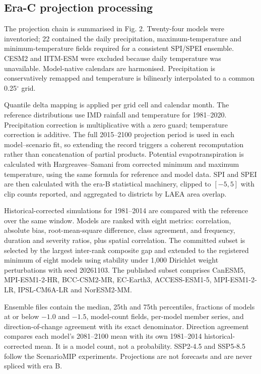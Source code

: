 \documentclass[11pt,a4paper]{article}
\begin{document}
\subsection*{Era-C projection processing}
The projection chain is summarised in Fig. 2. Twenty-four models were inventoried; 22 contained the daily precipitation, maximum-temperature and minimum-temperature fields required for a consistent SPI/SPEI ensemble. CESM2 and IITM-ESM were excluded because daily temperature was unavailable. Model-native calendars are harmonised. Precipitation is conservatively remapped and temperature is bilinearly interpolated to a common 0.25$^\circ$ grid.

Quantile delta mapping is applied per grid cell and calendar month\citep{Cannon2015}. The reference distributions use IMD rainfall and temperature for 1981--2020. Precipitation correction is multiplicative with a zero guard; temperature correction is additive. The full 2015--2100 projection period is used in each model--scenario fit, so extending the record triggers a coherent recomputation rather than concatenation of partial products. Potential evapotranspiration is calculated with Hargreaves--Samani\citep{HargreavesSamani1985} from corrected minimum and maximum temperature, using the same formula for reference and model data. SPI and SPEI are then calculated with the era-B statistical machinery, clipped to $[-5,5]$ with clip counts reported, and aggregated to districts by LAEA area overlap.

Historical-corrected simulations for 1981--2014 are compared with the reference over the same window. Models are ranked with eight metrics: correlation, absolute bias, root-mean-square difference, class agreement, and frequency, duration and severity ratios, plus spatial correlation. The committed subset is selected by the largest inter-rank composite gap and extended to the registered minimum of eight models using stability under 1,000 Dirichlet weight perturbations with seed 20261103. The published subset comprises CanESM5, MPI-ESM1-2-HR, BCC-CSM2-MR, EC-Earth3, ACCESS-ESM1-5, MPI-ESM1-2-LR, IPSL-CM6A-LR and NorESM2-MM.

Ensemble files contain the median, 25th and 75th percentiles, fractions of models at or below $-1.0$ and $-1.5$, model-count fields, per-model member series, and direction-of-change agreement with its exact denominator. Direction agreement compares each model's 2081--2100 mean with its own 1981--2014 historical-corrected mean. It is a model count, not a probability. SSP2-4.5 and SSP5-8.5 follow the ScenarioMIP experiments\citep{ONeill2016,Riahi2017}. Projections are not forecasts and are never spliced with era B.
\end{document}
